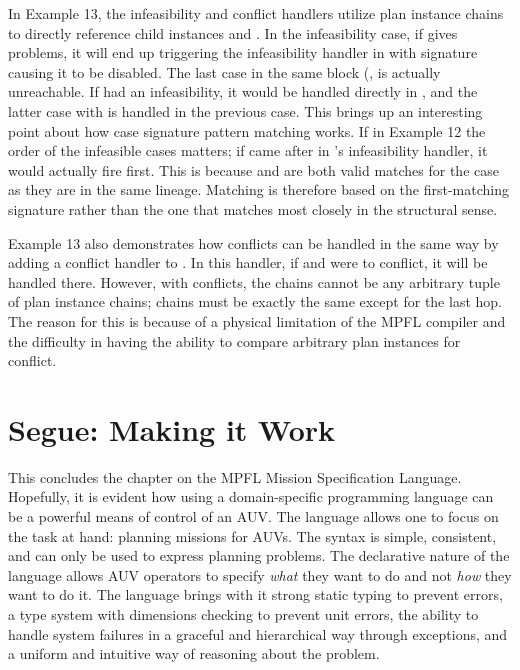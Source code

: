 In Example 13, the infeasibility and conflict handlers utilize plan instance chains to directly reference child instances  and . In the infeasibility case, if  gives problems, it will end up triggering the infeasibility handler in  with signature  causing it to be disabled. The last case in the same block (, is actually unreachable. If  had an infeasibility, it would be handled directly in , and the latter case with  is handled in the previous case. This brings up an interesting point about how case signature pattern matching works. If in Example 12 the order of the infeasible cases matters; if  came after  in 's infeasibility handler, it would actually fire first. This is because  and  are both valid matches for the case as they are in the same lineage. Matching is therefore based on the first-matching signature rather than the one that matches most closely in the structural sense.

Example 13 also demonstrates how conflicts can be handled in the same way by adding a conflict handler to . In this handler, if  and  were to conflict, it will be handled there. However, with conflicts, the chains cannot be any arbitrary tuple of plan instance chains; chains must be exactly the same except for the last hop. The reason for this is because of a physical limitation of the MPFL compiler and the difficulty in having the ability to compare arbitrary plan instances for conflict.

\section{Segue: Making it Work}
This concludes the chapter on the MPFL Mission Specification Language. Hopefully, it is evident how using a domain-specific programming language can be a powerful means of control of an AUV. The language allows one to focus on the task at hand: planning missions for AUVs. The syntax is simple, consistent, and can only be used to express planning problems. The declarative nature of the language allows AUV operators to specify \emph{what} they want to do and not \emph{how} they want to do it. The language brings with it strong static typing to prevent errors, a type system with dimensions checking to prevent unit errors, the ability to handle system failures in a graceful and hierarchical way through exceptions, and a uniform and intuitive way of reasoning about the problem. 

